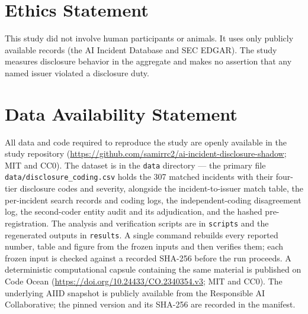 \documentclass[utf8]{FrontiersinHarvard}
\begin{document}
\section*{Ethics Statement}
This study did not involve human participants or animals. It uses only publicly available records (the AI Incident Database and SEC EDGAR). The study measures disclosure behavior in the aggregate and makes no assertion that any named issuer violated a disclosure duty.

\section*{Data Availability Statement}
All data and code required to reproduce the study are openly available in the study repository (\url{https://github.com/samirrc2/ai-incident-disclosure-shadow}; MIT and CC0). The dataset is in the \texttt{data} directory --- the primary file \texttt{data/disclosure\_coding.csv} holds the 307 matched incidents with their four-tier disclosure codes and severity, alongside the incident-to-issuer match table, the per-incident search records and coding logs, the independent-coding disagreement log, the second-coder entity audit and its adjudication, and the hashed pre-registration. The analysis and verification scripts are in \texttt{scripts} and the regenerated outputs in \texttt{results}. A single command rebuilds every reported number, table and figure from the frozen inputs and then verifies them; each frozen input is checked against a recorded SHA-256 before the run proceeds. A deterministic computational capsule containing the same material is published on Code Ocean (\url{https://doi.org/10.24433/CO.2340354.v3}; MIT and CC0). The underlying AIID snapshot is publicly available from the Responsible AI Collaborative; the pinned version and its SHA-256 are recorded in the manifest.



\end{document}
